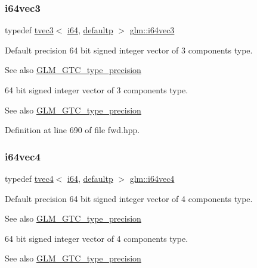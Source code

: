 \subsubsection{\texorpdfstring{i64vec3}{i64vec3}}
{\footnotesize\ttfamily typedef \mbox{\hyperlink{structglm_1_1tvec3}{tvec3}}$<$ \mbox{\hyperlink{group__gtc__type__precision_gac7a7eaad46064fc952b06df33689da23}{i64}}, \mbox{\hyperlink{namespaceglm_a0f04f086094c747d227af4425893f545a9d21ccd8b5a009ec7eb7677befc3bf51}{defaultp}} $>$ \mbox{\hyperlink{group__gtc__type__precision_ga189eb8d6a197bc491cabb6e1f120ecf4}{glm\+::i64vec3}}}

Default precision 64 bit signed integer vector of 3 components type. \begin{DoxySeeAlso}{See also}
\mbox{\hyperlink{group__gtc__type__precision}{G\+L\+M\+\_\+\+G\+T\+C\+\_\+type\+\_\+precision}}
\end{DoxySeeAlso}
64 bit signed integer vector of 3 components type. \begin{DoxySeeAlso}{See also}
\mbox{\hyperlink{group__gtc__type__precision}{G\+L\+M\+\_\+\+G\+T\+C\+\_\+type\+\_\+precision}} 
\end{DoxySeeAlso}


Definition at line 690 of file fwd.\+hpp.

\mbox{\label{group__gtc__type__precision_gade5e969a6155752095d2cd603bda9408}} 
\subsubsection{\texorpdfstring{i64vec4}{i64vec4}}
{\footnotesize\ttfamily typedef \mbox{\hyperlink{structglm_1_1tvec4}{tvec4}}$<$ \mbox{\hyperlink{group__gtc__type__precision_gac7a7eaad46064fc952b06df33689da23}{i64}}, \mbox{\hyperlink{namespaceglm_a0f04f086094c747d227af4425893f545a9d21ccd8b5a009ec7eb7677befc3bf51}{defaultp}} $>$ \mbox{\hyperlink{group__gtc__type__precision_gade5e969a6155752095d2cd603bda9408}{glm\+::i64vec4}}}

Default precision 64 bit signed integer vector of 4 components type. \begin{DoxySeeAlso}{See also}
\mbox{\hyperlink{group__gtc__type__precision}{G\+L\+M\+\_\+\+G\+T\+C\+\_\+type\+\_\+precision}}
\end{DoxySeeAlso}
64 bit signed integer vector of 4 components type. \begin{DoxySeeAlso}{See also}
\mbox{\hyperlink{group__gtc__type__precision}{G\+L\+M\+\_\+\+G\+T\+C\+\_\+type\+\_\+precision}} 
\end{DoxySeeAlso}


